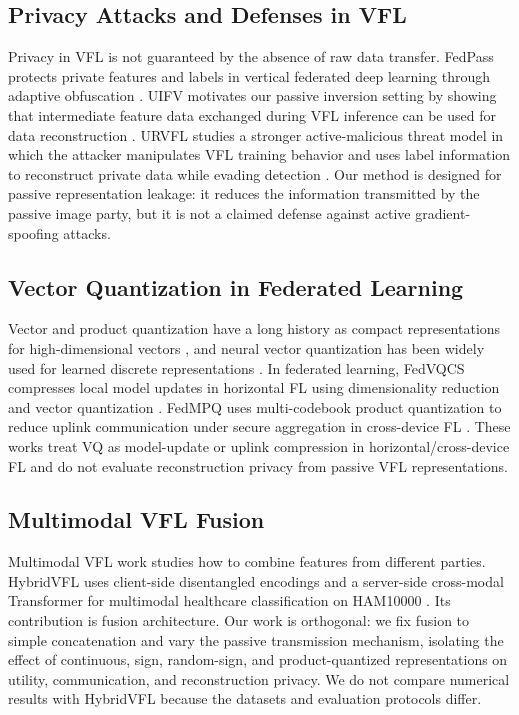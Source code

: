 \documentclass{article}
\begin{document}
\subsection{Privacy Attacks and Defenses in VFL}

Privacy in VFL is not guaranteed by the absence of raw data transfer. FedPass protects private features and labels in vertical federated deep learning through adaptive obfuscation \citep{gu2023fedpass}. UIFV motivates our passive inversion setting by showing that intermediate feature data exchanged during VFL inference can be used for data reconstruction \citep{yang2024uifv}. URVFL studies a stronger active-malicious threat model in which the attacker manipulates VFL training behavior and uses label information to reconstruct private data while evading detection \citep{yao2025urvfl}. Our method is designed for passive representation leakage: it reduces the information transmitted by the passive image party, but it is not a claimed defense against active gradient-spoofing attacks.

\subsection{Vector Quantization in Federated Learning}

Vector and product quantization have a long history as compact representations for high-dimensional vectors \citep{jegou2011product}, and neural vector quantization has been widely used for learned discrete representations \citep{oord2017neural}. In federated learning, FedVQCS compresses local model updates in horizontal FL using dimensionality reduction and vector quantization \citep{oh2024fedvqcs}. FedMPQ uses multi-codebook product quantization to reduce uplink communication under secure aggregation in cross-device FL \citep{yang2024fedmpq}. These works treat VQ as model-update or uplink compression in horizontal/cross-device FL and do not evaluate reconstruction privacy from passive VFL representations.

\subsection{Multimodal VFL Fusion}

Multimodal VFL work studies how to combine features from different parties. HybridVFL uses client-side disentangled encodings and a server-side cross-modal Transformer for multimodal healthcare classification on HAM10000 \citep{anoosha2025hybridvfl}. Its contribution is fusion architecture. Our work is orthogonal: we fix fusion to simple concatenation and vary the passive transmission mechanism, isolating the effect of continuous, sign, random-sign, and product-quantized representations on utility, communication, and reconstruction privacy. We do not compare numerical results with HybridVFL because the datasets and evaluation protocols differ.
\end{document}
